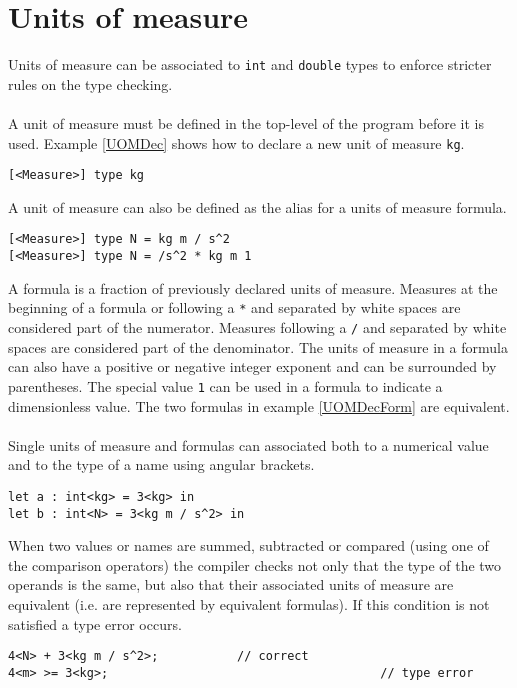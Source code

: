 \documentclass[]{article}
\begin{document}
	\section{Units of measure}
		Units of measure can be associated to \lstinline|int| and \lstinline|double| types to enforce stricter rules on the type checking.\\\\
		A unit of measure must be defined in the top-level of the program before it is used. Example \ref{UOMDec} shows how to declare a new unit of measure \lstinline|kg|.
		\begin{lstlisting}[caption={Unit of measure declaration}, label=UOMDec]
[<Measure>] type kg
		\end{lstlisting}
		A unit of measure can also be defined as the alias for a units of measure formula.
		\begin{lstlisting}[caption={Unit of measure declaration with formula}, label=UOMDecForm]
[<Measure>] type N = kg m / s^2
[<Measure>] type N = /s^2 * kg m 1
		\end{lstlisting}
		A formula is a fraction of previously declared units of measure. Measures at the beginning of a formula or following a \lstinline|*| and separated by white spaces are considered part of the numerator. Measures following a \lstinline|/| and separated by white spaces are considered part of the denominator. The units of measure in a formula can also have a positive or negative integer exponent and can be surrounded by parentheses. The special value \lstinline|1| can be used in a formula to indicate a dimensionless value. The two formulas in example \ref{UOMDecForm} are equivalent.\\\\
		Single units of measure and formulas can associated both to a numerical value and to the type of a name using angular brackets.
		\begin{lstlisting}[caption={Associating units of measure}, label=UOM]
let a : int<kg> = 3<kg> in
let b : int<N> = 3<kg m / s^2> in
		\end{lstlisting}
		When two values or names are summed, subtracted or compared (using one of the comparison operators) the compiler checks not only that the type of the two operands is the same, but also that their associated units of measure are equivalent (i.e. are represented by equivalent formulas). If this condition is not satisfied a type error occurs.
		\begin{lstlisting}[caption={Units of measure with operators}, label=UOMOp]
4<N> + 3<kg m / s^2>;			// correct
4<m> >= 3<kg>;										// type error
		\end{lstlisting}
\end{document}
